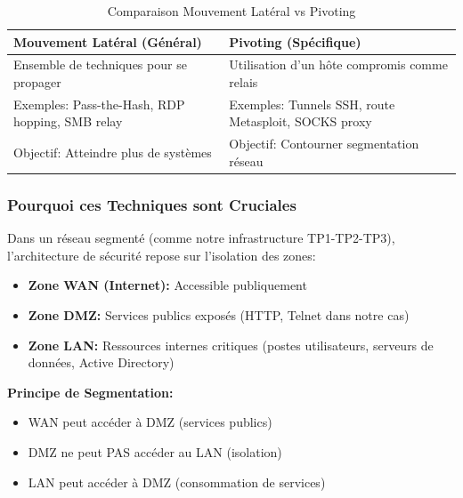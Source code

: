 \documentclass[12pt,a4paper,openany]{report}
\newcommand{\tableheadcolor}{\rowcolor{tableheadbg}}
\begin{document}
	\begin{table}[H]
		\centering
		\renewcommand{\arraystretch}{1.4}
		\setlength{\arrayrulewidth}{0.5pt}
		\begin{tabular}{p{6.5cm} p{6.5cm}}
			\arrayrulecolor{tableborder}
			\hline
			\tableheadcolor
			\textcolor{tableheadfg}{\textbf{Mouvement Latéral (Général)}} &
			\textcolor{tableheadfg}{\textbf{Pivoting (Spécifique)}} \\
			\hline
			\rowcolor{tablerowalt}
			Ensemble de techniques pour se propager & 
			Utilisation d'un hôte compromis comme relais \\
			
			Exemples: Pass-the-Hash, RDP hopping, SMB relay & 
			Exemples: Tunnels SSH, route Metasploit, SOCKS proxy \\
			
			\rowcolor{tablerowalt}
			Objectif: Atteindre plus de systèmes & 
			Objectif: Contourner segmentation réseau \\
			\hline
		\end{tabular}
		\caption{Comparaison Mouvement Latéral vs Pivoting}
	\end{table}
	
	\subsubsection{Pourquoi ces Techniques sont Cruciales}
	
	Dans un réseau segmenté (comme notre infrastructure TP1-TP2-TP3), 
	l'architecture de sécurité repose sur l'isolation des zones:
	
	\begin{itemize}
		\item \textbf{Zone WAN (Internet):} Accessible publiquement
		\item \textbf{Zone DMZ:} Services publics exposés (HTTP, Telnet dans notre cas)
		\item \textbf{Zone LAN:} Ressources internes critiques (postes utilisateurs, 
		serveurs de données, Active Directory)
	\end{itemize}
	
	\textbf{Principe de Segmentation:}
	\begin{itemize}
		\item WAN peut accéder à DMZ (services publics)
		\item DMZ ne peut PAS accéder au LAN (isolation)
		\item LAN peut accéder à DMZ (consommation de services)
	\end{itemize}
	
\end{document}
